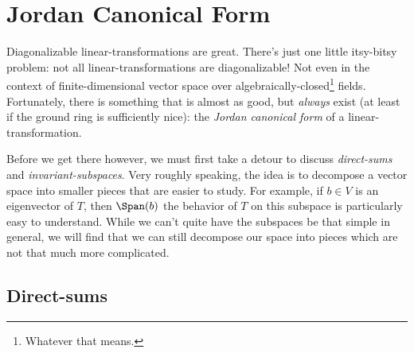 \section{Jordan Canonical Form}

Diagonalizable linear-transformations are great.  There's just one little itsy-bitsy problem:  not all linear-transformations are diagonalizable!  Not even in the context of finite-dimensional vector space over algebraically-closed\footnote{Whatever that means.} fields.  Fortunately, there is something that is almost as good, but \emph{always} exist (at least if the ground ring is sufficiently nice):  the \emph{Jordan canonical form} of a linear-transformation.

Before we get there however, we must first take a detour to discuss \emph{direct-sums} and \emph{invariant-subspaces}.  Very roughly speaking, the idea is to decompose a vector space into smaller pieces that are easier to study.  For example, if $b\in V$ is an eigenvector of $T$, then $\Span (b)$ the behavior of $T$ on this subspace is particularly easy to understand.  While we can't quite have the subspaces be that simple in general, we will find that we can still decompose our space into pieces which are not that much more complicated.

\subsection{Direct-sums}

